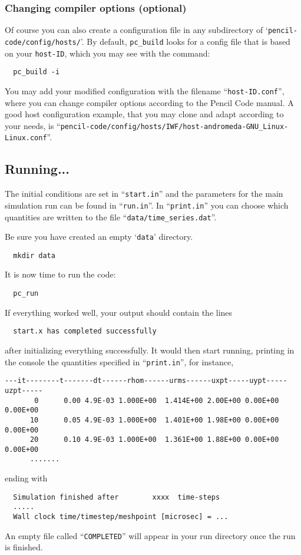 \documentclass[a4paper,12pt]{article}
\newcommand{\command}[1]{\texttt{#1}}
\newcommand{\file}[1]{``\texttt{#1}''}
\newcommand{\directory}[1]{`\texttt{#1}'}
\newcommand{\code}[1]{\texttt{#1}}
\begin{document}
\subsubsection{Changing compiler options (optional)}

Of course you can also create a configuration file in any subdirectory of \directory{pencil-code/config/hosts/}.
By default, \command{pc\_build} looks for a config file that is based on your \code{host-ID}, which you may see with the command:
\begin{verbatim}
  pc_build -i
\end{verbatim}
You may add your modified configuration with the filename \file{host-ID.conf}, where you can change compiler options according to the Pencil Code manual.
A good host configuration example, that you may clone and adapt according to your needs, is \file{pencil-code/config/hosts/IWF/host-andromeda-GNU\_Linux-Linux.conf}.

\subsection{Running...}

The initial conditions are set in \file{start.in} and the parameters for the main simulation run can be found in \file{run.in}.
In \file{print.in} you can choose which quantities are written to the file \file{data/time\_series.dat}.

Be sure you have created an empty \directory{data} directory.
\begin{verbatim}
  mkdir data
\end{verbatim}

It is now time to run the code:
\begin{verbatim}
  pc_run
\end{verbatim}
If everything worked well, your output should contain the lines
\begin{verbatim}
  start.x has completed successfully
\end{verbatim}
after initializing everything successfully. It would then start running,   
printing in the console the quantities specified in \file{print.in}, for 
instance,
\begin{verbatim}
---it--------t-------dt------rhom------urms------uxpt-----uypt-----uzpt-----
       0      0.00 4.9E-03 1.000E+00  1.414E+00 2.00E+00 0.00E+00 0.00E+00
      10      0.05 4.9E-03 1.000E+00  1.401E+00 1.98E+00 0.00E+00 0.00E+00
      20      0.10 4.9E-03 1.000E+00  1.361E+00 1.88E+00 0.00E+00 0.00E+00 
      .......
\end{verbatim}
ending with
\begin{verbatim}
  Simulation finished after        xxxx  time-steps
  .....
  Wall clock time/timestep/meshpoint [microsec] = ...
\end{verbatim}
An empty file called \file{COMPLETED} will appear in your run directory once 
the run is finished.
\end{document}
